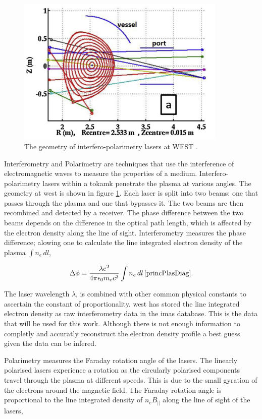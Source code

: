 \begin{figure}[H]
  \centering
  \includegraphics[width=10cm]{images/interfgeo.png}
  \caption{The geometry of interfero-polarimetry lasers at WEST \cite{westinterfero}.}
  \label{fig:interfgeo}
\end{figure}

Interferometry and Polarimetry are techniques that use the interference of electromagnetic waves to measure the properties of a medium. Interfero-polarimetry lasers within a tokamk penetrate the plasma at various angles. The geometry at \gls{west} is shown in figure \ref{fig:interfgeo}. Each laser is split into two beams: one that passes through the plasma and one that bypasses it. The two beams are then recombined and detected by a receiver. The phase difference between the two beams depends on the difference in the optical path length, which is affected by the electron density along the line of sight. Interferometry measures the phase difference; alowing one to calculate the line integrated electron density of the plasma $\int n_e \, dl$, 

\begin{equation} 
  \label{eq:int_phase}
  \Delta\phi = \frac{\lambda e^{2}}{4 \pi \epsilon_0 m_e c^2 } \int n_e \, dl \, \cite{princPlasDiag}.
\end{equation}

\noindent The laser wavelength $\lambda$, is combined with other common physical constants to ascertain the constant of proportionality. \gls{west} has stored the line integrated electron density as raw interferometry data in the \gls{imas} database. This is the data that will be used for this work. Although there is not enough information to completly and accuratly reconstruct the electron density profile a best guess given the data can be infered.

Polarimetry measures the Faraday rotation angle of the lasers. The linearly polarised lasers experience a rotation as the circularly polarised components travel through the plasma at different speeds. This is due to the small gyration of the electrons around the magnetic field. The Faraday rotation angle is proportional to the line integrated density of $n_e B_{||}$ along the line of sight of the lasers, 


